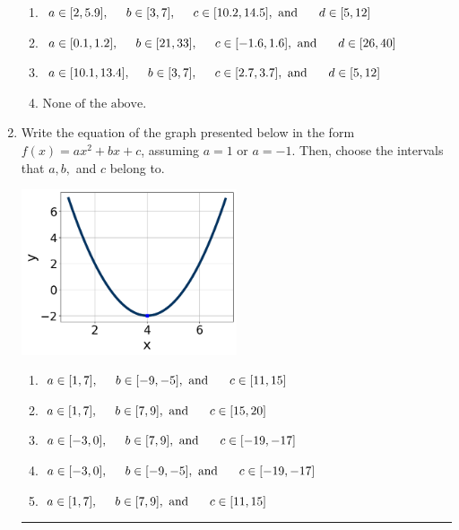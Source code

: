 \documentclass[14pt]{extbook}
\newcommand{\litem}[1]{\item#1\hspace*{-1cm}\rule{\textwidth}{0.4pt}}
\begin{document}
\begin{enumerate}
{\begin{enumerate}[label=\Alph*.]
\item \( a \in [2, 5.9], \hspace*{5mm} b \in [3, 7], \hspace*{5mm} c \in [10.2, 14.5], \text{ and } \hspace*{5mm} d \in [5, 12] \)
\item \( a \in [0.1, 1.2], \hspace*{5mm} b \in [21, 33], \hspace*{5mm} c \in [-1.6, 1.6], \text{ and } \hspace*{5mm} d \in [26, 40] \)
\item \( a \in [10.1, 13.4], \hspace*{5mm} b \in [3, 7], \hspace*{5mm} c \in [2.7, 3.7], \text{ and } \hspace*{5mm} d \in [5, 12] \)
\item \( \text{None of the above.} \)

\end{enumerate} }
\litem{
Write the equation of the graph presented below in the form $f(x)=ax^2+bx+c$, assuming  $a=1$ or $a=-1$. Then, choose the intervals that $a, b,$ and $c$ belong to.
\begin{center}
    \includegraphics[width=0.5\textwidth]{../Figures/quadraticGraphToEquationCopyA.png}
\end{center}
\begin{enumerate}[label=\Alph*.]
\item \( a \in [1, 7], \hspace*{5mm} b \in [-9, -5], \text{ and } \hspace*{5mm} c \in [11, 15] \)
\item \( a \in [1, 7], \hspace*{5mm} b \in [7, 9], \text{ and } \hspace*{5mm} c \in [15, 20] \)
\item \( a \in [-3, 0], \hspace*{5mm} b \in [7, 9], \text{ and } \hspace*{5mm} c \in [-19, -17] \)
\item \( a \in [-3, 0], \hspace*{5mm} b \in [-9, -5], \text{ and } \hspace*{5mm} c \in [-19, -17] \)
\item \( a \in [1, 7], \hspace*{5mm} b \in [7, 9], \text{ and } \hspace*{5mm} c \in [11, 15] \)


\end{enumerate}}
\end{enumerate}
\end{document}
